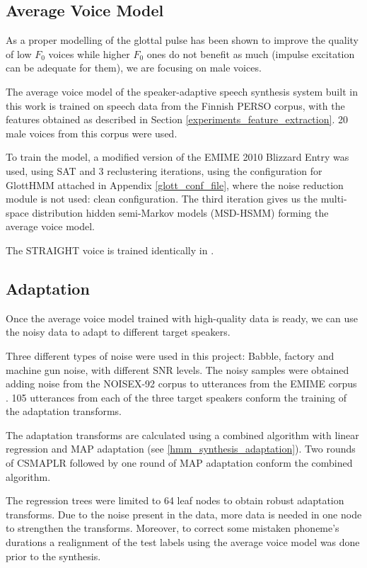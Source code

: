 \subsection{Average Voice Model}
\label{experiments_av_voice_model}
As a proper modelling of the glottal pulse has been shown to improve the quality of low $F_{0}$ voices while higher $F_{0}$ ones do not benefit as much (impulse excitation can be adequate for them), we are focusing on male voices.

The average voice model of the speaker-adaptive speech synthesis system built in this work is trained on speech data from the Finnish PERSO corpus, with the features obtained as described in Section \ref{experiments_feature_extraction}.
%
20 male voices from this corpus were used.

To train the model, a modified version of the EMIME 2010 Blizzard Entry \cite{emime_blizzard} was used, using SAT and 3 reclustering iterations, using the configuration for GlottHMM attached in Appendix \ref{glott_conf_file}, where the noise reduction module is not used: clean configuration. 
%
The third iteration gives us the multi-space distribution hidden semi-Markov models (MSD-HSMM) forming the average voice model.

The STRAIGHT voice is trained identically in \cite{karhila_jstsp_14}.

\subsection{Adaptation}
\label{experiments_adaptation}
Once the average voice model trained with high-quality data is ready, we can use the noisy data to adapt to different target speakers.

Three different types of noise were used in this project: Babble, factory and machine gun noise, with different SNR levels.
%
The noisy samples were obtained adding noise from the NOISEX-92 corpus \cite{Varga1993247} to utterances from the EMIME corpus \cite{wester_accent2010}.
%
105 utterances from each of the three target speakers conform the training of the adaptation transforms.

The adaptation transforms are calculated using a combined algorithm with linear regression and MAP adaptation (see \ref{hmm_synthesis_adaptation}).
%
Two rounds of CSMAPLR followed by one round of MAP adaptation conform the combined algorithm.

The regression trees were limited to 64 leaf nodes to obtain robust adaptation transforms.
%
Due to the noise present in the data, more data is needed in one node to strengthen the transforms.
%
Moreover, to correct some mistaken phoneme's durations a realignment of the test labels using the average voice model was done prior to the synthesis.


